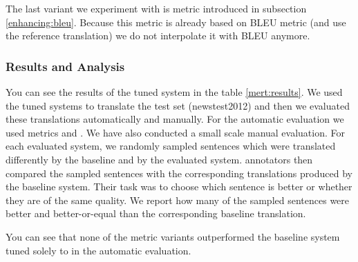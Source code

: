 The last variant we experiment with is  metric introduced
in subsection \ref{enhancing:bleu}. Because this metric is already based on
BLEU metric (and use the reference translation) we do not interpolate it with
BLEU anymore.


\subsubsection{Results and Analysis}

You can see the results of the tuned system in the table \ref{mert:results}. We
used the tuned systems to translate the test set (newstest2012) and then we
evaluated these translations automatically and manually. For the automatic
evaluation we used metrics   and
 . We have also conducted a small
scale manual evaluation. For each evaluated system, we randomly sampled
 sentences which were translated differently by the baseline and by
the evaluated system.  annotators then compared the sampled
sentences with the corresponding translations produced by the baseline system.
Their task was to choose which sentence is better or whether they are of the
same quality. We report how many of the sampled sentences were better and
better-or-equal than the corresponding baseline translation.

You can see that none of the metric variants outperformed the baseline system
tuned solely to  in the automatic evaluation.

